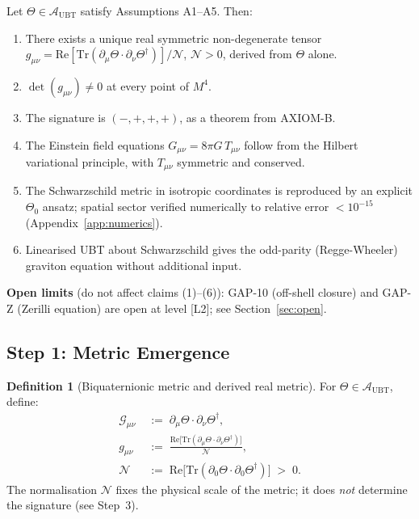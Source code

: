 \documentclass[12pt,a4paper]{article}
\theoremstyle{definition}
\newtheorem{definition}[theorem]{Definition}
\theoremstyle{remark}
\newcommand{\Aubt}{\mathcal{A}_{\mathrm{UBT}}}
\newcommand{\Gmn}{G_{\mu\nu}}
\newcommand{\gmn}{g_{\mu\nu}}
\newcommand{\Tmn}{T_{\mu\nu}}
\newcommand{\Tr}{\mathrm{Tr}}
\newcommand{\Re}{\mathrm{Re}}
\begin{document}
\begin{tcolorbox}[colback=blue!3!white,colframe=blue!55!black,
  title={\textbf{Main Theorem (GR Recovery)}}]
Let $\Theta \in \Aubt$ satisfy Assumptions A1--A5.  Then:
\begin{enumerate}[label=\textbf{(\arabic*)}]
  \item There exists a unique real symmetric non-degenerate tensor
        $\gmn = \Re[\Tr(\partial_\mu\Theta\cdot\partial_\nu\Theta^\dagger)]/\mathcal{N}$,
        $\mathcal{N}>0$, derived from $\Theta$ alone.
  \item $\det(g_{\mu\nu}) \neq 0$ at every point of $M^4$.
  \item The signature is $(-,+,+,+)$, as a theorem from AXIOM-B.
  \item The Einstein field equations
        $\Gmn = 8\pi G\,\Tmn$ follow from the Hilbert variational principle,
        with $\Tmn$ symmetric and conserved.
  \item The Schwarzschild metric in isotropic coordinates is reproduced by
        an explicit $\Theta_0$ ansatz; spatial sector verified numerically to
        relative error $<10^{-15}$ (Appendix~\ref{app:numerics}).
  \item Linearised UBT about Schwarzschild gives the odd-parity
        (Regge-Wheeler) graviton equation without additional input.
\end{enumerate}
\textbf{Open limits} (do not affect claims (1)--(6)): GAP-10 (off-shell closure)
and GAP-Z (Zerilli equation) are open at level [L2]; see Section~\ref{sec:open}.
\end{tcolorbox}

\subsection{Step 1: Metric Emergence}
\label{sec:step1}

\begin{definition}[Biquaternionic metric and derived real metric]
\label{def:metric}
For $\Theta \in \Aubt$, define:
\begin{align}
  \mathcal{G}_{\mu\nu} &\;:=\; \partial_\mu\Theta \cdot \partial_\nu\Theta^\dagger,
  \label{eq:biq_metric} \\
  \gmn &\;:=\;
    \frac{\Re\bigl[\Tr(\partial_\mu\Theta\cdot\partial_\nu\Theta^\dagger)\bigr]}{\mathcal{N}},
  \label{eq:real_metric} \\
  \mathcal{N} &\;:=\;
    \Re\bigl[\Tr(\partial_0\Theta\cdot\partial_0\Theta^\dagger)\bigr] \;>\; 0.
  \label{eq:norm}
\end{align}
The normalisation $\mathcal{N}$ fixes the physical scale of the metric;
it does \emph{not} determine the signature (see Step~3).
\end{definition}
\end{document}
